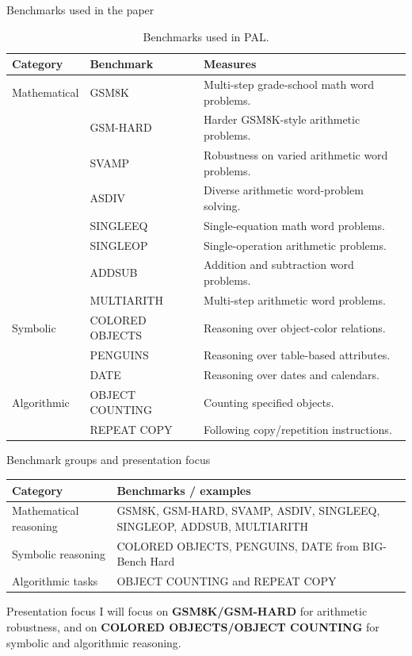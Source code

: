 \begin{frame}{Benchmarks used in the paper}
\scriptsize
\begin{table}[h]
\centering
\begin{tabular}{@{}p{}p{}p{}@{}}
\hline
\textbf{Category} & \textbf{Benchmark} & \textbf{Measures} \\
\hline
Mathematical & GSM8K & Multi-step grade-school math word problems. \\
 & GSM-HARD & Harder GSM8K-style arithmetic problems. \\
 & SVAMP & Robustness on varied arithmetic word problems. \\
 & ASDIV & Diverse arithmetic word-problem solving. \\
 & SINGLEEQ & Single-equation math word problems. \\
 & SINGLEOP & Single-operation arithmetic problems. \\
 & ADDSUB & Addition and subtraction word problems. \\
 & MULTIARITH & Multi-step arithmetic word problems. \\
\hline
Symbolic & COLORED OBJECTS & Reasoning over object-color relations. \\
 & PENGUINS & Reasoning over table-based attributes. \\
 & DATE & Reasoning over dates and calendars. \\
\hline
Algorithmic & OBJECT COUNTING & Counting specified objects. \\
 & REPEAT COPY & Following copy/repetition instructions. \\
\hline
\end{tabular}
\caption{Benchmarks used in PAL.}
\label{tab:reasoning_benchmarks}
\end{table}
\end{frame}

\begin{frame}{Benchmark groups and presentation focus}
\small
\begin{table}
\centering
\begin{tabular}{@{}p{}p{}@{}}
\toprule
\textbf{Category} & \textbf{Benchmarks / examples} \\
\midrule
Mathematical reasoning & GSM8K, GSM-HARD, SVAMP, ASDIV, SINGLEEQ, SINGLEOP, ADDSUB, MULTIARITH \\
Symbolic reasoning & COLORED OBJECTS, PENGUINS, DATE from BIG-Bench Hard \\
Algorithmic tasks & OBJECT COUNTING and REPEAT COPY \\
\bottomrule
\end{tabular}
\end{table}
\vspace{0.15cm}
\begin{block}{Presentation focus}
I will focus on \textbf{GSM8K/GSM-HARD} for arithmetic robustness, and on \textbf{COLORED OBJECTS/OBJECT COUNTING} for symbolic and algorithmic reasoning.
\end{block}
\end{frame}
